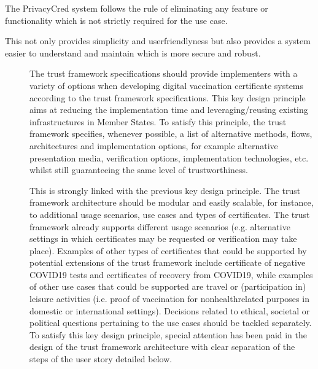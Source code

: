 \documentclass[a4paper,12pt,english]{sphinxhowto}
\begin{document}
\begin{sphinxShadowBox}

\sphinxAtStartPar
The PrivacyCred system follows the rule of  eliminating any feature or functionality which is not strictly required for the use case.

\sphinxAtStartPar
This not only provides simplicity and user\sphinxhyphen{}friendlyness but also provides a system easier to understand and maintain which is more secure and robust.
\end{sphinxShadowBox}
\begin{description}
\item[{}] \leavevmode
\sphinxAtStartPar
The trust framework specifications should provide implementers with a variety of options when developing digital vaccination certificate systems according to the trust framework specifications. This key design principle aims at reducing the implementation time and leveraging/reusing existing infrastructures in Member States. To satisfy this principle, the trust framework specifies, whenever possible, a list of alternative methods, flows, architectures and implementation options, for example alternative presentation media, verification options, implementation technologies, etc. whilst still guaranteeing the same level of trustworthiness.

\item[{}] \leavevmode
\sphinxAtStartPar
This is strongly linked with the previous key design principle. The trust framework architecture should be modular and easily scalable, for instance, to additional usage scenarios, use cases and types of certificates. The trust framework already supports different usage scenarios (e.g. alternative settings in which certificates may be requested or verification may take place). Examples of other types of certificates that could be supported by potential extensions of the trust framework include certificate of negative COVID\sphinxhyphen{}19 tests and certificates of recovery from COVID\sphinxhyphen{}19, while examples of other use cases that could be supported are travel or (participation in) leisure activities (i.e. proof of vaccination for non\sphinxhyphen{}health\sphinxhyphen{}related purposes in domestic or international settings). Decisions related to ethical, societal or political questions pertaining to the use cases should be tackled separately. To satisfy this key design principle, special attention has been paid in the design of the trust framework architecture with clear separation of the steps of the user story detailed below.

\end{description}
\end{document}
